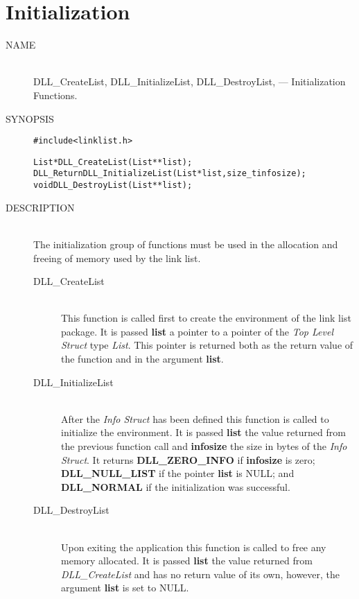 \documentclass[10pt,letterpaper]{report}
\begin{document}
\section*{Initialization}
\begin{description}
\item[NAME]\quad\\
DLL\_CreateList, DLL\_InitializeList, DLL\_DestroyList, --- Initialization Functions.

\item[SYNOPSIS]
\begin{alltt}

#include <linklist.h>

List *DLL_CreateList(List **list);
DLL_Return DLL_InitializeList(List *list, size_t infosize);
void DLL_DestroyList(List **list);
\end{alltt}

\item[DESCRIPTION]\quad\\
The initialization group of functions must be used in the allocation and freeing of memory used by the link list.

 \begin{description}
 \item[DLL\_CreateList]\quad\\
 This function is called first to create the environment of the link list package.  It is passed \textbf{list} a pointer to a pointer of the \emph{Top Level Struct} type \emph{List}.  This pointer is returned both as the return value of the function and in the argument \textbf{list}.

 \item[DLL\_InitializeList]\quad\\
 After the \emph{Info Struct} has been defined this function is called to initialize the environment.  It is passed \textbf{list} the value returned from the previous function call and \textbf{infosize} the size in bytes of the \emph{Info Struct}.  It returns \textbf{DLL\_ZERO\_INFO} if \textbf{infosize} is zero; \textbf{DLL\_NULL\_LIST} if the pointer \textbf{list} is NULL; and \textbf{DLL\_NORMAL} if the initialization was successful.

 \item[DLL\_DestroyList]\quad\\
 Upon exiting the application this function is called to free any memory allocated.  It is passed \textbf{list} the value returned from \emph{DLL\_CreateList} and has no return value of its own, however, the argument \textbf{list} is set to NULL.
 \end{description}


\end{description}
\end{document}
